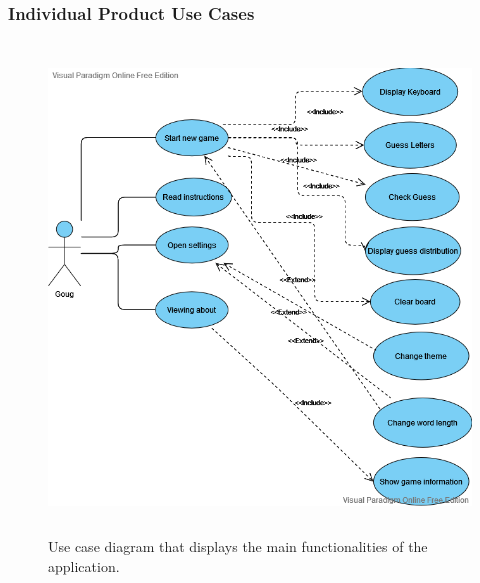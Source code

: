 \documentclass[12pt, titlepage]{article}
\begin{document}
	\subsubsection{Individual Product Use Cases}
	\begin{figure}[h]
		\centering
		\includegraphics[width=12cm, height=13cm]{usecase.png}
		\caption{Use case diagram that displays the main functionalities of the 
			application.}
	\end{figure}
	
	
	\newpage
\end{document}
